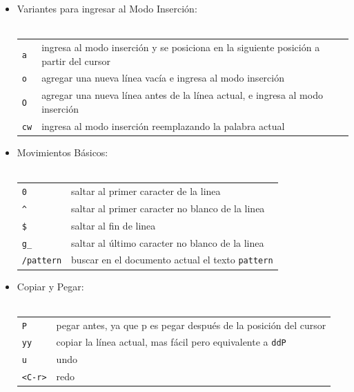 \documentclass[12pt]{article}
\begin{document}
\begin{itemize}
	\item Variantes para ingresar al Modo Inserción: \\ \\
\begin{tabular}{ l l }
            \texttt{a} & ingresa al modo inserción y se posiciona en la siguiente posición a partir del cursor \\
            \texttt{o} & agregar una nueva línea vacía e ingresa al modo inserción \\
            \texttt{O} & agregar una nueva línea antes de la línea actual, e ingresa al modo inserción \\
            \texttt{cw} & ingresa al modo inserción reemplazando la palabra actual \\
\end{tabular}
\end{itemize}



\begin{itemize}
	\item Movimientos Básicos: \\ \\
\begin{tabular}{ l l }
            \texttt{0} & saltar al primer caracter de la linea \\
            \texttt{\^} & saltar al primer caracter no blanco de la linea \\
            \texttt{\$} & saltar al fin de linea \\
            \texttt{g\_} & saltar al último caracter no blanco de la linea \\
            \texttt{/pattern} & buscar en el documento actual el texto \texttt{pattern} \\
\end{tabular}
\end{itemize}



\begin{itemize}
	\item Copiar y Pegar: \\ \\
\begin{tabular}{ l l }
            \texttt{P} & pegar antes, ya que p es pegar después de la posición del cursor \\
            \texttt{yy} & copiar la línea actual, mas fácil pero equivalente a \texttt{ddP} \\
            \texttt{u} & undo \\
            \texttt{<C-r>} & redo \\
\end{tabular}
\end{itemize}
\end{document}
